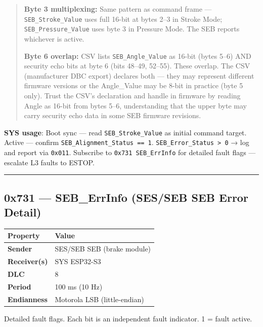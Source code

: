 \documentclass[12pt,a4paper,oneside]{report}
\begin{document}
\begin{quote}
\textbf{Byte 3 multiplexing:} Same pattern as command frame ---
\texttt{SEB\_Stroke\_Value} uses full 16-bit at bytes 2--3 in Stroke Mode;
\texttt{SEB\_Pressure\_Value} uses byte 3 in Pressure Mode. The SEB reports
whichever is active.

\textbf{Byte 6 overlap:} CSV lists \texttt{SEB\_Angle\_Value} as 16-bit (bytes
5--6) AND security echo bits at byte 6 (bits 48--49, 52--55). These overlap. The
CSV (manufacturer DBC export) declares both --- they may represent different
firmware versions or the Angle\_Value may be 8-bit in practice (byte 5 only).
Trust the CSV's declaration and handle in firmware by reading Angle as 16-bit
from bytes 5--6, understanding that the upper byte may carry security echo data
in some SEB firmware revisions.
\end{quote}

\textbf{SYS usage}: Boot sync --- read \texttt{SEB\_Stroke\_Value} as initial
command target. Active --- confirm \texttt{SEB\_Alignment\_Status\ ==\ 1}.
\texttt{SEB\_Error\_Status\ \textgreater{}\ 0} → log and report via
\texttt{0x011}. Subscribe to \texttt{0x731\ SEB\_ErrInfo} for detailed fault
flags --- escalate L3 faults to ESTOP.

\begin{center}\rule{0.5\linewidth}{0.5pt}\end{center}

\subsection{0x731 --- SEB\_ErrInfo (SES/SEB SEB Error
Detail)}\label{x731-seb_errinfo-SES/SEB-seb-error-detail}

\begin{longtable}[]{@{}ll@{}}
\toprule\noalign{}
Property & Value \\
\midrule\noalign{}
\endhead
\bottomrule\noalign{}
\endlastfoot
\textbf{Sender} & SES/SEB SEB (brake module) \\
\textbf{Receiver(s)} & SYS ESP32-S3 \\
\textbf{DLC} & 8 \\
\textbf{Period} & 100 ms (10 Hz) \\
\textbf{Endianness} & Motorola LSB (little-endian) \\
\end{longtable}

Detailed fault flags. Each bit is an independent fault indicator. 1 = fault
active.
\end{document}
